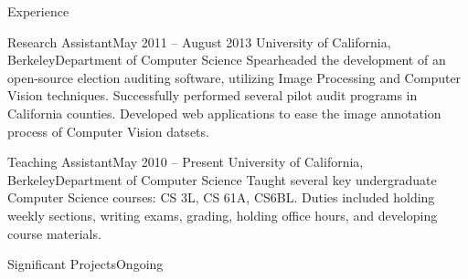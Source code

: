 \documentclass{resume}
\begin{document}
\begin{component}{Experience}
	\begin{position}{Research Assistant}{May 2011 -- August 2013}
	 	{University of California, Berkeley}{Department of Computer Science}
	{Spearheaded the development of an open-source election auditing software,
     utilizing Image Processing and Computer Vision techniques. 
     Successfully performed
         several pilot audit programs in California counties.
     Developed web applications to ease the image annotation process of
     Computer Vision datsets.}
	\end{position}

	\begin{position}{Teaching Assistant}{May 2010 -- Present}
		{University of California, Berkeley}{Department of Computer Science}
	{Taught several key undergraduate Computer Science courses: CS 3L, CS 61A, CS6BL. 
	 Duties included holding weekly sections, writing exams, grading, 
	holding office hours, and developing course materials.}
	\end{position}

	\begin{position}{Significant Projects}{Ongoing}
		{}{\vspace{-2.0em}}


\end{position}
\end{component}
\end{document}
